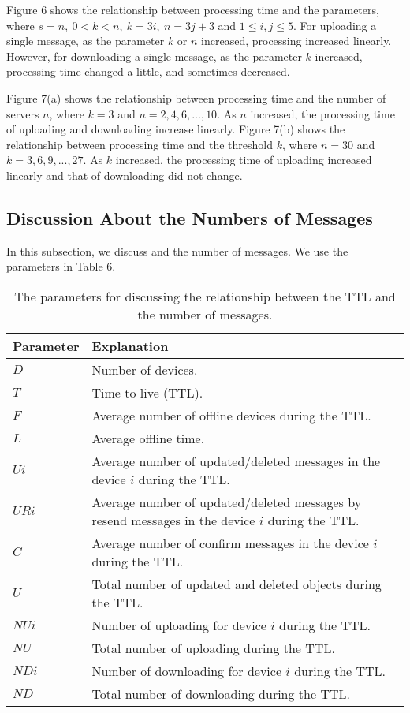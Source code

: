 Figure 6 shows the relationship between processing time and the parameters, where $s=n,\ 0< k < n,\ k=3i,\ n=3j+3$ and $ 1 \leq i, j \leq 5$.
For uploading a single message, as the parameter ${k}$ or ${n}$ increased, processing increased linearly.
However, for downloading a single message, as the parameter ${k}$ increased, processing time  changed a little, and sometimes decreased.

Figure 7(a) shows the relationship between processing time and the number of servers ${n}$, where ${k=3}$ and ${n = 2, 4, 6, ... , 10}$.
As $n$ increased, the processing time of uploading and downloading increase linearly. 
Figure 7(b) shows the relationship between processing time and the threshold ${k}$, where ${n=30}$ and ${k = 3, 6, 9, ... , 27}$.
As $k$ increased, the processing time of uploading increased linearly and that of downloading did not change.

\subsection{Discussion About the Numbers of Messages}

In this subsection, we discuss and the number of messages. 
We use the parameters in Table 6.

\begin{table*}[t]
	\centering
	\footnotesize
	\caption{The parameters for discussing the relationship between the TTL and the number of messages.}
	\begin{tabular}{ll}
		\hline
		\textbf{Parameter} & \textbf{Explanation} \\ \hline
		$D$ & Number of devices. \\
		$T$ & Time to live (TTL). \\
		$F$ & Average number of offline devices during the TTL. \\
		$L$ & Average offline time. \\
		$Ui$ & Average number of updated/deleted messages in the device $i$ during the TTL. \\ 
		$URi$ &  Average number of updated/deleted messages by resend messages in the device $i$ during the TTL.\\ 
		$C$ & Average number of confirm messages in the device $i$ during the TTL. \\ 
		$U$ & Total number of updated and deleted objects during the TTL. \\ 
		$NUi$ & Number of uploading for device $i$ during the TTL. \\
		$NU$ & Total number of uploading during the TTL. \\
		$NDi$ & Number of downloading for device $i$ during the TTL. \\
		$ND$ & Total number of downloading during the TTL. \\ \hline
	\end{tabular}
\end{table*}

